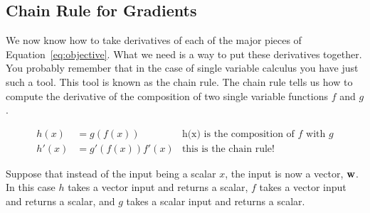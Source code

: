\documentclass[assignment04_Solutions]{subfiles}
\begin{document}
\begin{exercise}[(60 minutes)]
\begin{boxedsolution}
\end{boxedsolution}
%
%
%

\ees

\end{exercise}

\subsection{Chain Rule for Gradients}
We now know how to take derivatives of each of the major pieces of Equation~\ref{eq:objective}.  What we need is a way to put these derivatives together.  You probably remember that in the case of single variable calculus you have just such a tool.  This tool is known as the chain rule.  The chain rule tells us how to compute the derivative of the composition of two single variable functions $f$ and $g$.  

\begin{align}
h(x)&= g(f(x))&\mbox{h(x) is the composition of $f$ with $g$} \nonumber \\
h'(x) &= g'(f(x))f'(x)&\mbox{this is the chain rule!}
\end{align}

Suppose that instead of the input being a scalar $x$, the input is now a vector, $\mathbf{w}$.  In this case $h$ takes a vector input and returns a scalar, $f$ takes a vector input and returns a scalar, and $g$ takes a scalar input and returns a scalar.
\end{document}
